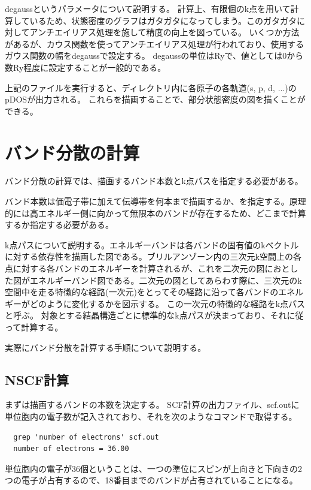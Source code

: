 degaussというパラメータについて説明する。
計算上、有限個のk点を用いて計算しているため、状態密度のグラフはガタガタになってしまう。このガタガタに対してアンチエイリアス処理を施して精度の向上を図っている。
いくつか方法があるが、カウス関数を使ってアンチエイリアス処理が行われており、使用するガウス関数の幅をdegaussで設定する。
degaussの単位はRyで、値としては0から数Ry程度に設定することが一般的である\cite{SCF_example_qiita}。

上記のファイルを実行すると、ディレクトリ内に各原子の各軌道(s, p, d, ...)のpDOSが出力される。
これらを描画することで、部分状態密度の図を描くことができる。

\section{バンド分散の計算}
バンド分散の計算では、描画するバンド本数とk点パスを指定する必要がある。

バンド本数は価電子帯に加えて伝導帯を何本まで描画するか、を指定する。原理的には高エネルギー側に向かって無限本のバンドが存在するため、どこまで計算するか指定する必要がある。

k点パスについて説明する。エネルギーバンドは各バンドの固有値のkベクトルに対する依存性を描画した図である。ブリルアンゾーン内の三次元k空間上の各点に対する各バンドのエネルギーを計算されるが、これを二次元の図におとした図がエネルギーバンド図である。二次元の図としてあらわす際に、三次元のk空間中を走る特徴的な経路(一次元)をとってその経路に沿って各バンドのエネルギーがどのように変化するかを図示する。
この一次元の特徴的な経路をk点パスと呼ぶ。
対象とする結晶構造ごとに標準的なk点パスが決まっており、それに従って計算する。

実際にバンド分散を計算する手順について説明する。

\subsection{NSCF計算}
まずは描画するバンドの本数を決定する。
SCF計算の出力ファイル、scf.outに単位胞内の電子数が記入されており、それを次のようなコマンドで取得する。
\begin{code}
\begin{verbatim}
  grep 'number of electrons' scf.out
  number of electrons = 36.00
\end{verbatim}
\end{code}
単位胞内の電子が36個ということは、一つの準位にスピンが上向きと下向きの2つの電子が占有するので、18番目までのバンドが占有されていることになる。

